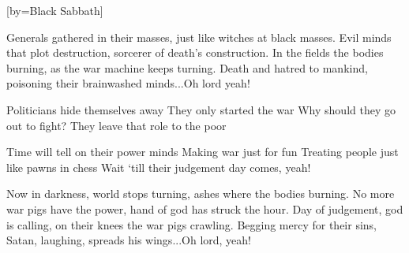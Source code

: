 

[by=Black Sabbath]


\beginverse
Generals gathered in their masses,
just like witches at black masses.
Evil minds that plot destruction,
sorcerer of death's construction.
In the fields the bodies burning,
as the war machine keeps turning.
Death and hatred to mankind,
poisoning their brainwashed minds...Oh lord yeah!
\endverse

\beginverse
Politicians hide themselves away
They only started the war
Why should they go out to fight?
They leave that role to the poor
\endverse

\beginverse
Time will tell on their power minds
Making war just for fun
Treating people just like pawns in chess
Wait `till their judgement day comes, yeah!
\endverse

\beginverse
Now in darkness, world stops turning,
ashes where the bodies burning.
No more war pigs have the power,
hand of god has struck the hour.
Day of judgement, god is calling,
on their knees the war pigs crawling.
Begging mercy for their sins,
Satan, laughing, spreads his wings...Oh lord, yeah!
\endverse



\chordson
\endsong
